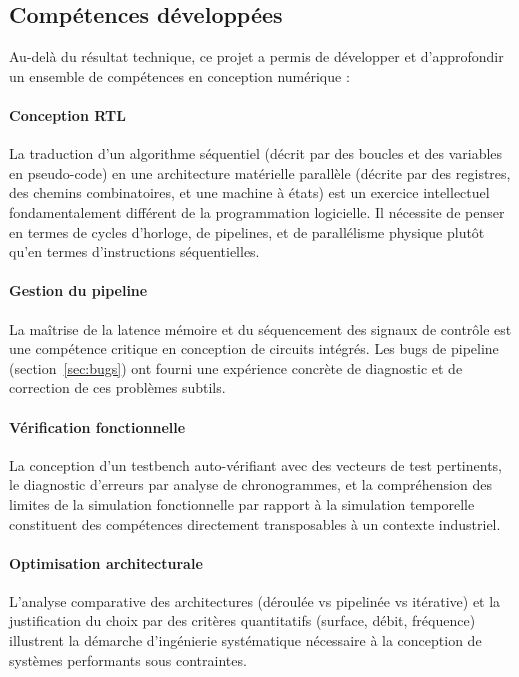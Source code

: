 \subsection{Compétences développées}

Au-delà du résultat technique, ce projet a permis de développer et d'approfondir un ensemble de compétences en conception numérique :

\paragraph{Conception RTL} La traduction d'un algorithme séquentiel (décrit par des boucles et des variables en pseudo-code) en une architecture matérielle parallèle (décrite par des registres, des chemins combinatoires, et une machine à états) est un exercice intellectuel fondamentalement différent de la programmation logicielle. Il nécessite de penser en termes de cycles d'horloge, de pipelines, et de parallélisme physique plutôt qu'en termes d'instructions séquentielles.

\paragraph{Gestion du pipeline} La maîtrise de la latence mémoire et du séquencement des signaux de contrôle est une compétence critique en conception de circuits intégrés. Les bugs de pipeline (section~\ref{sec:bugs}) ont fourni une expérience concrète de diagnostic et de correction de ces problèmes subtils.

\paragraph{Vérification fonctionnelle} La conception d'un testbench auto-vérifiant avec des vecteurs de test pertinents, le diagnostic d'erreurs par analyse de chronogrammes, et la compréhension des limites de la simulation fonctionnelle par rapport à la simulation temporelle constituent des compétences directement transposables à un contexte industriel.

\paragraph{Optimisation architecturale} L'analyse comparative des architectures (déroulée vs pipelinée vs itérative) et la justification du choix par des critères quantitatifs (surface, débit, fréquence) illustrent la démarche d'ingénierie systématique nécessaire à la conception de systèmes performants sous contraintes.

